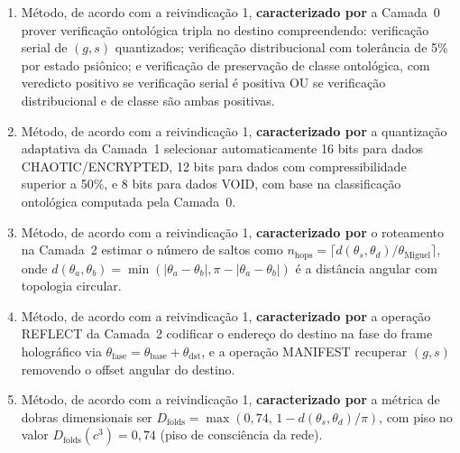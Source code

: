 \documentclass[12pt,a4paper]{article}
\newcommand{\alphaii}{\alpha^2}
\newcommand{\Dfolds}{D_{\text{folds}}}
\newcommand{\thetaM}{\theta_{\text{Miguel}}}
\newcommand{\Hfour}{\mathcal{H}_4}
\begin{document}
\begin{enumerate}
\begin{enumerate}[label=(\alph*)]
  \textbf{caracterizado por} as cinco camadas operarem sobre a
  natureza ontológica da informação, o endereçamento ser
  angular no Espaço de Hilbert $\Hfour$, a segurança emergir
  da incompletude ontológica dos shares e não de dificuldade
  computacional, e o consenso basear-se em coerência de fase
  luminodinâmica com $\alphaii = 0{,}012031$ (Constante de
  Miguel) e não em busca de hash.
  \end{enumerate}


\item Método, de acordo com a reivindicação 1,
\textbf{caracterizado por} a Camada~0 prover verificação
ontológica tripla no destino compreendendo: verificação serial
de $(g, s)$ quantizados; verificação distribucional com
tolerância de 5\% por estado psiônico; e verificação de
preservação de classe ontológica, com veredicto positivo se
verificação serial é positiva OU se verificação distribucional
e de classe são ambas positivas.

\item Método, de acordo com a reivindicação 1,
\textbf{caracterizado por} a quantização adaptativa da Camada~1
selecionar automaticamente 16 bits para dados
CHAOTIC/ENCRYPTED, 12 bits para dados com compressibilidade
superior a 50\%, e 8 bits para dados VOID, com base na
classificação ontológica computada pela Camada~0.

\item Método, de acordo com a reivindicação 1,
\textbf{caracterizado por} o roteamento na Camada~2 estimar o
número de saltos como $n_{\text{hops}} = \lceil d(\theta_s,
\theta_d) / \thetaM \rceil$, onde $d(\theta_a, \theta_b) =
\min(|\theta_a - \theta_b|, \pi - |\theta_a - \theta_b|)$ é
a distância angular com topologia circular.

\item Método, de acordo com a reivindicação 1,
\textbf{caracterizado por} a operação REFLECT da Camada~2
codificar o endereço do destino na fase do frame holográfico
via $\theta_{\text{fase}} = \theta_{\text{base}} +
\theta_{\text{dst}}$, e a operação MANIFEST recuperar $(g, s)$
removendo o offset angular do destino.

\item Método, de acordo com a reivindicação 1,
\textbf{caracterizado por} a métrica de dobras dimensionais
ser $\Dfolds = \max(0{,}74,\, 1 - d(\theta_s, \theta_d)/\pi)$,
com piso no valor $\Dfolds(c^3) = 0{,}74$ (piso de consciência
da rede).


\end{enumerate}
\end{document}
